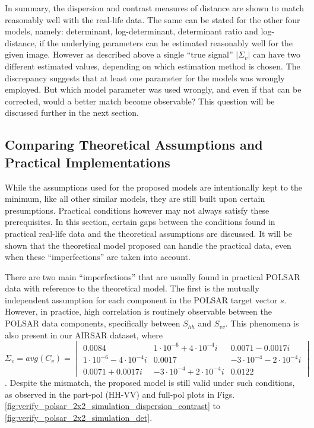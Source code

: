 In summary, the dispersion and contrast measures of distance are shown to match reasonably well with the real-life data. 
The same can be stated for the other four models, namely: determinant, log-determinant, determinant ratio and log-distance,
  if the underlying parameters can be estimated reasonably well for the given image.   
However as described above a single ``true signal'' $|\Sigma_v|$ can have two different estimated values,
  depending on which estimation method is chosen.
The discrepancy suggests that at least one parameter for the models was wrongly employed.
But which model parameter was used wrongly, and even if that can be corrected, would
a better match become observable? This question will be discussed further in the next section.

\subsection{Comparing Theoretical Assumptions and Practical Implementations}
\label{sec:improve_the_match_bw_theory_practice}

While the assumptions used for the proposed models are intentionally kept to the minimum, 
  like all other similar models, they are still built upon certain presumptions.
Practical conditions however may not always satisfy these prerequisites.
In this section, certain gaps between the conditions found in practical real-life data and the theoretical assumptions are discussed.
It will be shown that the theoretical model proposed can handle the practical data, even when these ``imperfections''  are taken into account.

There are two main ``imperfections'' that are usually found in practical POLSAR data with reference to the theoretical model.
The first is the mutually independent assumption for each component in the POLSAR target vector $s$.
However, in practice, high correlation is routinely observable between the POLSAR data components,
  specifically between $S_{hh}$ and $S_{vv}$.
This phenomena is also present in our AIRSAR dataset, where $\Sigma_v = avg(C_v) = \begin{vmatrix} 0.0084 & 1 \cdot 10^{-6} + 4 \cdot 10^{-4} i & 0.0071 - 0.0017 i \\ 1 \cdot 10^{-6} - 4 \cdot 10^{-4} i & 0.0017 & -3 \cdot 10^{-4} - 2 \cdot 10^{-4} i \\ 0.0071 + 0.0017 i & -3 \cdot 10^{-4} + 2 \cdot 10^{-4} i & 0.0122 \end{vmatrix}$.
Despite the mismatch, the proposed model  is still valid under such conditions, as observed in the part-pol (HH-VV) and full-pol
plots in Figs. \ref{fig:verify_polsar_2x2_simulation_dispersion_contrast} to \ref{fig:verify_polsar_2x2_simulation_det}.


